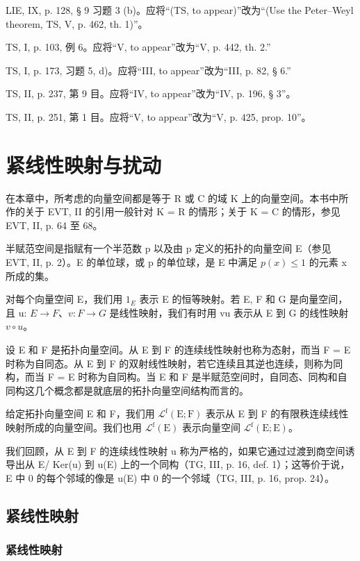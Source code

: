 LIE, IX, p. 128, § 9 习题 3 (b)。应将“(TS, to appear)”改为“(Use the Peter--Weyl theorem, TS, V, p. 462, th. 1)”。

TS, I, p. 103, 例 6。应将“V, to appear”改为“V, p. 442, th. 2.”

TS, I, p. 173, 习题 5, d)。应将“III, to appear”改为“III, p. 82, § 6.”

TS, II, p. 237, 第 9 目。应将“IV, to appear”改为“IV, p. 196, § 3”。

TS, II, p. 251, 第 1 目。应将“V, to appear”改为“V, p. 425, prop. 10”。

\chapter{紧线性映射与扰动}
\setcounter{exercisepar}{0}

在本章中，所考虑的向量空间都是等于 R 或 C 的域 K 上的向量空间。本书中所作的关于 EVT, II 的引用一般针对 K = R 的情形；关于 K = C 的情形，参见 EVT, II, p. 64 至 68。

半赋范空间是指赋有一个半范数 p 以及由 p 定义的拓扑的向量空间 E（参见 EVT, II, p. 2）。E 的单位球，或 p 的单位球，是 E 中满足 \(p(x) \leqslant 1\) 的元素 x 所成的集。

对每个向量空间 E，我们用 \(1_{E}\) 表示 E 的恒等映射。若 E, F 和 G 是向量空间，且 u: \(E \rightarrow F\)、\(v: F \rightarrow G\) 是线性映射，我们有时用 vu 表示从 E 到 G 的线性映射 \(v \circ u\)。

设 E 和 F 是拓扑向量空间。从 E 到 F 的连续线性映射也称为态射，而当 F = E 时称为自同态。从 E 到 F 的双射线性映射，若它连续且其逆也连续，则称为同构，而当 F = E 时称为自同构。当 E 和 F 是半赋范空间时，自同态、同构和自同构这几个概念都是就底层的拓扑向量空间结构而言的。

给定拓扑向量空间 E 和 F，我们用 \(\mathcal{L}^{\mathrm{f}}(\mathrm{E};\mathrm{F})\) 表示从 E 到 F 的有限秩连续线性映射所成的向量空间。我们也用 \(\mathcal{L}^{\mathrm{f}}(\mathrm{E})\) 表示向量空间 \(\mathcal{L}^{\mathrm{f}}(\mathrm{E};\mathrm{E})\)。

我们回顾，从 E 到 F 的连续线性映射 u 称为严格的，如果它通过过渡到商空间诱导出从 E/ Ker(u) 到 u(E) 上的一个同构（TG, III, p. 16, def. 1）；这等价于说，E 中 0 的每个邻域的像是 u(E) 中 0 的一个邻域（TG, III, p. 16, prop. 24）。

\section{紧线性映射}

\subsection{紧线性映射}

